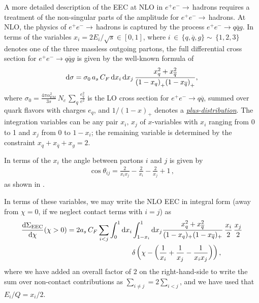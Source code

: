 
A more detailed description of the EEC at NLO in \(e^+e^-\to\,\)hadrons requires a treatment of the non-singular parts of the amplitude for \(e^+ e^- \to\,\)hadrons.
%
At NLO, the physics of \(e^+ e^- \to\,\)hadrons is captured by the process \(e^+ e^- \to q \overline{q} g\).
%
In terms of the variables \(x_i = 2 E_i / \sqrt{s} \in [0, 1]\), where \(i\,\in\,\{q,\overline{q},g\}\sim\,\{1,2,3\}\) denotes one of the three massless outgoing partons, the full differential cross section for \(e^+e^-\to q \overline{q} g\) is given by the well-known formula of \Eq{} 
\begin{align}
    \dd \sigma
    =
    \sigma_0
    \,
    a_s \, C_F
    \,
    \dd x_i\,\dd x_j
    \,
    \frac{x_q^2 + x_{\overline{q}}^2}{
          {(1-x_q)}_+
          {(1-x_{\overline{q}})}_+
    }
    ,
\end{align}
where \(
    \sigma_0 =
    \frac{4\pi \alpha_{\text{EM}}^2}{3 s}
    \,N_c\,\sum_q \frac{e_q^2}{e^2}
\)
is the LO cross section for \(e^+e^-\to q \overline{q}\), summed over quark flavors with charges \(e_q\), and \(1/{(1-x)}_+\) denotes a \hyperlink{footnote:plusfn_defn}{\textit{plus-distribution}}.
%
The integration variables can be any pair \(x_i,\,x_j\) of \(x\)-variables with \(x_i\) ranging from 0 to 1 and \(x_j\) from 0 to \(1-x_i\);
%
the remaining variable is determined by the constraint \(x_q + x_{\overline{q}} + x_g = 2\).

In terms of the \(x_i\) the angle between partons \(i\) and \(j\) is given by
\begin{align}
    \cos\theta_{ij} = \frac{2}{x_i x_j} - \frac{2}{x_i} - \frac{2}{x_j} + 1
    \,,
\end{align}
as shown in .

In terms of these variables, we may write the NLO EEC in integral form (away from \(\chi = 0\), if we neglect contact terms with \(i=j\)) as
\begin{align}
    \label{eq:ee2hadrons_EEC}
    \frac{\dd\Sigma_\text{EEC}}{\dd\chi}
    (\chi>0)
    =
    2
    \ascf
    \sum_{i<j}
    \int_0^1 \dd x_i
    &
    \int_{1-x_i}^1 \dd x_j
    \frac{x_q^2 + x_{\overline{q}}^2}{(1-x_q)_+(1-x_{\overline{q}})_+}
    \,\frac{x_i}{2}
    \,\frac{x_j}{2}
    \\
    &
    \notag
    \delta\le(
        \chi
        -
        \le(
            \frac{1}{x_i} + \frac{1}{x_j} - \frac{1}{x_i x_j}
        \ri)
    \ri)
    ,
\end{align}
where we have added an overall factor of \(2\) on the right-hand-side to write the sum over non-contact contributions as \(\sum_{i \neq j} = 2 \sum_{i < j}\), and we have used that \(E_i/Q = x_i / 2\).

